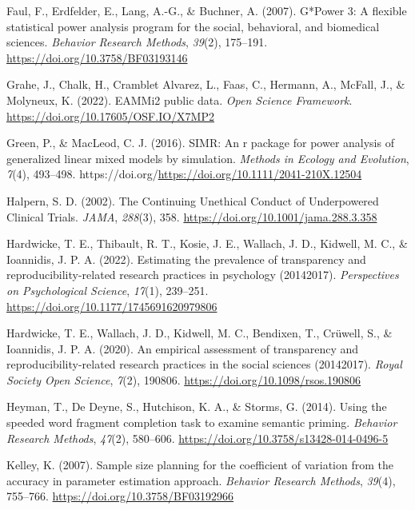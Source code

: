 \documentclass[
  man]{apa7}
\newlength{\cslhangindent}
\newlength{\cslentryspacingunit} %
\newenvironment{CSLReferences}[2] %
 {%
  \setlength{\parindent}{0pt}
  \ifodd #1
  \let\oldpar\par
  \def\par{\hangindent=\cslhangindent\oldpar}
  \fi
  \setlength{\parskip}{#2\cslentryspacingunit}
 }%
 {}
\begin{document}
\begin{CSLReferences}{1}{0}
\leavevmode{}%
Faul, F., Erdfelder, E., Lang, A.-G., \& Buchner, A. (2007). G*Power 3: A flexible statistical power analysis program for the social, behavioral, and biomedical sciences. \emph{Behavior Research Methods}, \emph{39}(2), 175--191. \url{https://doi.org/10.3758/BF03193146}

\leavevmode{}%
Grahe, J., Chalk, H., Cramblet Alvarez, L., Faas, C., Hermann, A., McFall, J., \& Molyneux, K. (2022). EAMMi2 public data. \emph{Open Science Framework}. \url{https://doi.org/10.17605/OSF.IO/X7MP2}

\leavevmode{}%
Green, P., \& MacLeod, C. J. (2016). SIMR: An r package for power analysis of generalized linear mixed models by simulation. \emph{Methods in Ecology and Evolution}, \emph{7}(4), 493--498. https://doi.org/\url{https://doi.org/10.1111/2041-210X.12504}

\leavevmode{}%
Halpern, S. D. (2002). The Continuing Unethical Conduct of Underpowered Clinical Trials. \emph{JAMA}, \emph{288}(3), 358. \url{https://doi.org/10.1001/jama.288.3.358}

\leavevmode{}%
Hardwicke, T. E., Thibault, R. T., Kosie, J. E., Wallach, J. D., Kidwell, M. C., \& Ioannidis, J. P. A. (2022). Estimating the prevalence of transparency and reproducibility-related research practices in psychology (2014{\textendash}2017). \emph{Perspectives on Psychological Science}, \emph{17}(1), 239--251. \url{https://doi.org/10.1177/1745691620979806}

\leavevmode{}%
Hardwicke, T. E., Wallach, J. D., Kidwell, M. C., Bendixen, T., Crüwell, S., \& Ioannidis, J. P. A. (2020). An empirical assessment of transparency and reproducibility-related research practices in the social sciences (2014{\textendash}2017). \emph{Royal Society Open Science}, \emph{7}(2), 190806. \url{https://doi.org/10.1098/rsos.190806}

\leavevmode{}%
Heyman, T., De Deyne, S., Hutchison, K. A., \& Storms, G. (2014). Using the speeded word fragment completion task to examine semantic priming. \emph{Behavior Research Methods}, \emph{47}(2), 580--606. \url{https://doi.org/10.3758/s13428-014-0496-5}

\leavevmode{}%
Kelley, K. (2007). Sample size planning for the coefficient of variation from the accuracy in parameter estimation approach. \emph{Behavior Research Methods}, \emph{39}(4), 755--766. \url{https://doi.org/10.3758/BF03192966}


\end{CSLReferences}
\end{document}
